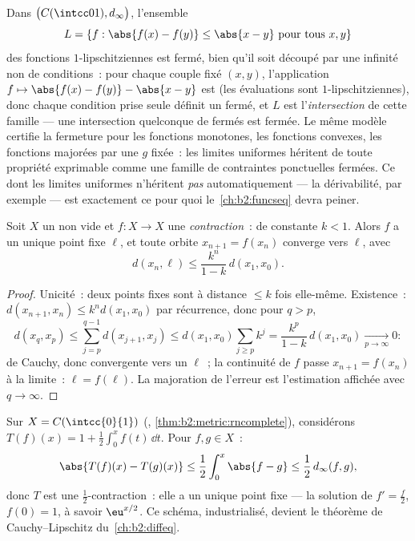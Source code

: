 \begin{example}\label{ex:b2:metric:lipclosed}
Dans $\bigl(C(\intcc01), d_\infty\bigr)$, l'ensemble
\[
L = \{f : \abs{f(x) - f(y)} \leq \abs{x - y}
\ \text{pour tous } x, y\}
\]
des fonctions $1$-lipschitziennes est fermé, bien qu'il soit
découpé par une infinité non  de conditions~: pour chaque
couple fixé $(x, y)$, l'application $f \mapsto \abs{f(x) - f(y)} -
\abs{x - y}$ est  (les évaluations sont
$1$-lipschitziennes), donc chaque condition prise seule définit un
fermé, et $L$ est l'\emph{intersection} de cette famille --- une
intersection quelconque de fermés est fermée. Le même modèle certifie
la fermeture pour les fonctions monotones, les fonctions convexes,
les fonctions majorées par une $g$ fixée~: les limites uniformes
héritent de toute propriété exprimable comme une famille de
contraintes ponctuelles fermées. Ce dont les limites uniformes
n'héritent \emph{pas} automatiquement --- la dérivabilité, par
exemple --- est exactement ce pour quoi le~\cref{ch:b2:funcseq} devra
peiner.
\end{example}

\begin{theorem}\label{thm:b2:metric:banach}
Soit $X$ un  non vide et $f \colon X \to X$
une \emph{contraction}~:  de constante $k < 1$. Alors
$f$ a un unique point fixe $\ell$, et toute orbite $x_{n+1} = f(x_n)$
converge vers $\ell$, avec
\[
d(x_n, \ell) \leq \frac{k^n}{1 - k}\, d(x_1, x_0) .
\]
\end{theorem}

\begin{proof}
Unicité~: deux points fixes sont à distance $\leq k$ fois
elle-même. Existence~: $d(x_{n+1}, x_n) \leq k^n d(x_1, x_0)$ par
récurrence, donc pour $q > p$,
\[
d(x_q, x_p) \leq \sum_{j=p}^{q-1} d(x_{j+1}, x_j)
\leq d(x_1, x_0) \sum_{j \geq p} k^j
= \frac{k^p}{1-k}\, d(x_1, x_0) \xrightarrow[p\to\infty]{} 0 :
\]
de Cauchy, donc convergente vers un $\ell$~; la continuité de $f$
passe $x_{n+1} = f(x_n)$ à la limite~: $\ell = f(\ell)$. La majoration
de l'erreur est l'estimation affichée avec $q \to \infty$.
\end{proof}

\begin{example}\label{ex:b2:metric:integralequation}
Sur $X = C(\intcc{0}{1})$ (,
\cref{thm:b2:metric:rncomplete}), considérons $T(f)(x) = 1 + \frac12
\int_0^x f(t)\,\dd t$. Pour $f, g \in X$~:
\[
\abs{T(f)(x) - T(g)(x)} \leq \frac12 \int_0^x \abs{f - g} \leq
\frac12\, d_\infty(f, g),
\]
donc $T$ est une $\frac12$-contraction~: elle a un unique point fixe
 --- la solution de $f' = \frac f2$, $f(0) = 1$, à savoir
$\eu^{x/2}$. Ce schéma, industrialisé, devient le théorème de
Cauchy--Lipschitz du~\cref{ch:b2:diffeq}.
\end{example}

